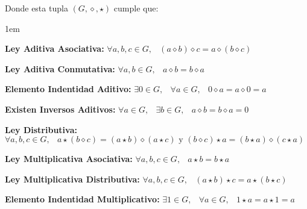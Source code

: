\documentclass[12pt, fleqn]{report}                             %
\newenvironment{Indentation}[1][0.75em]                         %
        {\begin{adjustwidth}{#1}{}}                                 %
        {\end{adjustwidth}}                                         %
\DeclareMathOperator \Space     {\quad}                         %
\DeclareMathOperator \MiniSpace {\;}                            %
\theoremstyle{break}                                            %
\begin{document}
                Donde esta tupla $(G, \diamond, \star)$ cumple que:
                \begin{Indentation}[1em]
                \begin{itemize}
                \small{
                    
                    \item 
                        \textbf{Ley Aditiva Asociativa:}
                        $\forall a, b, c \in G, \MiniSpace
                            (a \diamond b) \diamond c = a \diamond (b \diamond c)$

                    \item 
                        \textbf{Ley Aditiva Conmutativa:}
                        $\forall a, b \in G, \MiniSpace a \diamond b = b \diamond a$


                    \item 
                        \textbf{Elemento Indentidad Aditivo:}
                        $\exists 0 \in G, \MiniSpace
                            \forall a \in G, \MiniSpace 0 \diamond a = a \diamond 0 = a$

                    \item 
                        \textbf{Existen Inversos Aditivos:}
                        $\forall a \in G, \MiniSpace
                                \exists b \in G, \MiniSpace
                                    a \diamond b = b \diamond a = 0$


                    \item 
                        \textbf{Ley Distributiva:}
                        $\forall a, b, c \in G, \MiniSpace
                            a \star (b \diamond c) = (a \star b) \diamond (a \star c) 
                            \text{ y }
                            (b \diamond c)\star a = (b\star a) \diamond (c \star a)$

                    \item 
                        \textbf{Ley Multiplicativa Asociativa:}
                        $\forall a, b, c \in G, \MiniSpace
                            a \star b = b \star a$

                    \item 
                        \textbf{Ley Multiplicativa Distributiva:}
                        $\forall a, b, c \in G, \MiniSpace
                            (a \star b) \star c = a \star (b \star c)$

                    \item 
                        \textbf{Elemento Indentidad Multiplicativo:}
                        $\exists 1 \in G, \MiniSpace
                            \forall a \in G, \MiniSpace 1 \star a = a \star 1 = a$

}
\end{itemize}
\end{Indentation}
\end{document}
